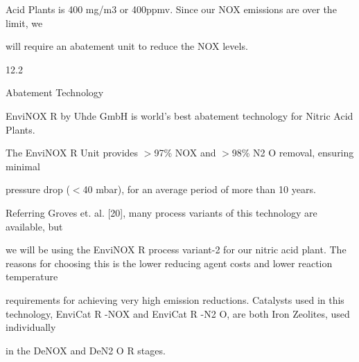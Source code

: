 \documentclass[a4paper,portrait,12pt]{article}
\begin{document}
\begin{flushleft}
Acid Plants is 400 mg/m3 or 400ppmv. Since our NOX emissions are over the limit, we
\end{flushleft}


\begin{flushleft}
will require an abatement unit to reduce the NOX levels.
\end{flushleft}





12.2





\begin{flushleft}
Abatement Technology
\end{flushleft}





\begin{flushleft}
EnviNOX R by Uhde GmbH is world's best abatement technology for Nitric Acid Plants.
\end{flushleft}


\begin{flushleft}
The EnviNOX R Unit provides $>$97\% NOX and $>$98\% N2 O removal, ensuring minimal
\end{flushleft}


\begin{flushleft}
pressure drop ($<$40 mbar), for an average period of more than 10 years.
\end{flushleft}


\begin{flushleft}
Referring Groves et. al. [20], many process variants of this technology are available, but
\end{flushleft}


\begin{flushleft}
we will be using the EnviNOX R process variant-2 for our nitric acid plant. The reasons for choosing this is the lower reducing agent costs and lower reaction temperature
\end{flushleft}


\begin{flushleft}
requirements for achieving very high emission reductions. Catalysts used in this technology, EnviCat R -NOX and EnviCat R -N2 O, are both Iron Zeolites, used individually
\end{flushleft}


\begin{flushleft}
in the DeNOX and DeN2 O R stages.
\end{flushleft}
\end{document}
